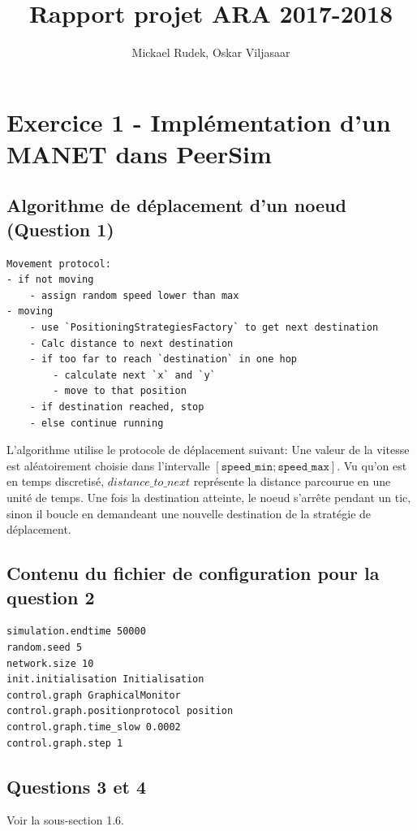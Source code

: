 \documentclass[a4paper]{article}
\title{Rapport projet ARA 2017-2018}
\author{Mickael Rudek, Oskar Viljasaar}
\begin{document}
\maketitle


\tableofcontents

\section{Exercice 1 - Implémentation d'un MANET dans PeerSim}
\subsection{Algorithme de déplacement d'un noeud (Question 1)}

\begin{verbatim}
Movement protocol:
- if not moving
    - assign random speed lower than max
- moving
    - use `PositioningStrategiesFactory` to get next destination
    - Calc distance to next destination
    - if too far to reach `destination` in one hop
        - calculate next `x` and `y`
        - move to that position
    - if destination reached, stop
    - else continue running
\end{verbatim}
L'algorithme utilise le protocole de déplacement suivant:
Une valeur de la vitesse est aléatoirement choisie dans l'intervalle
$ \left[ \texttt{speed\_min}; \texttt{speed\_max} \right] $.
Vu qu'on est en temps discretisé, $distance\_to\_next$ représente la
distance parcourue en une unité de temps.
Une fois la destination atteinte, le noeud s'arrête pendant un tic,
 sinon il boucle en demandeant une nouvelle destination de la
 stratégie de déplacement.


 \subsection{Contenu du fichier de configuration pour la question 2}

\begin{verbatim}
simulation.endtime 50000
random.seed 5
network.size 10
init.initialisation Initialisation
control.graph GraphicalMonitor
control.graph.positionprotocol position
control.graph.time_slow 0.0002
control.graph.step 1
\end{verbatim}

\subsection{Questions 3 et 4}
Voir la sous-section 1.6.
\end{document}
